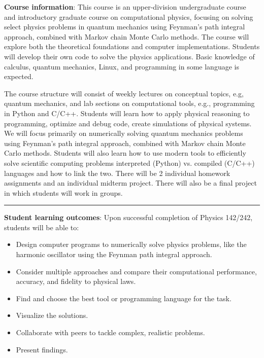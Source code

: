 \documentclass[12pt]{article}
\begin{document}
\noindent\textbf{Course information}: This course is an upper-division undergraduate course and introductory graduate course on computational physics, focusing on solving select physics problems in quantum mechanics using Feynman's path integral approach, combined with Markov chain Monte Carlo methods.
The course will explore both the theoretical foundations and computer implementations.
Students will develop their own code to solve the physics applications.
Basic knowledge of calculus, quantum mechanics, Linux, and programming in some language is expected.

The course structure will consist of weekly lectures on conceptual topics, e.g, quantum mechanics, and lab sections on computational tools, e.g., programming in Python and C/C++.
Students will learn how to apply physical reasoning to programming, optimize and debug code, create simulations of physical systems.
We will focus primarily on numerically solving quantum mechanics problems using Feynman's path integral approach, combined with Markov chain Monte Carlo methods.
Students will also learn how to use modern tools to efficiently solve scientific computing problems interpreted (Python) vs. compiled (C/C++) languages and how to link the two.
There will be 2 individual homework assignments and an individual midterm project.
There will also be a final project in which students will work in groups.

\begin{center}
  \rule{\textwidth}{0.5pt}
\end{center}

\noindent\textbf{Student learning outcomes}: Upon successful completion of Physics 142/242, students will be able to:
\begin{itemize}
  \itemsep-0.3em
  \item Design computer programs to numerically solve physics problems, like the harmonic oscillator using the Feynman path integral approach.
  \item Consider multiple approaches and compare their computational performance, accuracy, and fidelity to physical laws.
  \item Find and choose the best tool or programming language for the task.
  \item Visualize the solutions.
  \item Collaborate with peers to tackle complex, realistic problems.
  \item Present findings.
\end{itemize}
\end{document}
